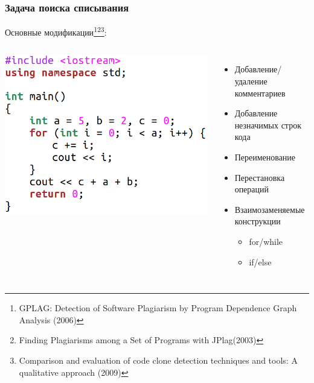\documentclass[10pt]{beamer}
\begin{document}
\begin{frame}\frametitle{Задача поиска списывания}
		\hspace{-0.5cm}
Основные модификации\footnote[frame]{GPLAG: Detection of Software Plagiarism by Program Dependence Graph Analysis (2006)}\footnote[frame]{Finding Plagiarisms among a Set of Programs with JPlag(2003)}\footnote[frame]{Comparison and evaluation of code clone detection techniques and tools: A qualitative approach (2009)}:
\begin{columns}
  \centering
  \includegraphics[scale=0.7]{clear.png}
  
  \centering
  \begin{itemize}
  	\item Добавление/удаление комментариев
  	\item Добавление незначимых строк кода
  	\item Переименование
  	\item Перестановка операций
  	\item Взаимозаменяемые конструкции
  	\begin{itemize}
  		\item for/while
  		\item if/else
  	\end{itemize}
  \end{itemize}
\end{columns}
\end{frame}
\end{document}
